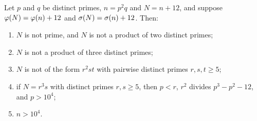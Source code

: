 \begin{theorem}
\label{thm:L}
Let \(p\) and \(q\) be distinct primes, \(n=p^2q\) and \(N=n+12\), and suppose \(\varphi(N)=\varphi(n)+12\) and \(\sigma(N)=\sigma(n)+12\). Then:
\begin{enumerate}
\item[\textup{(i)}] \(N\) is not prime, and \(N\) is not a product of two distinct primes;
\item[\textup{(ii)}] \(N\) is not a product of three distinct primes;
\item[\textup{(iii)}] \(N\) is not of the form \(r^2st\) with pairwise distinct primes \(r,s,t\ge 5\);
\item[\textup{(iv)}] if \(N=r^3s\) with distinct primes \(r,s\ge 5\), then \(p<r\), \(r^2\) divides \(p^3-p^2-12\), and \(p>10^4\);
\item[\textup{(v)}] \(n>10^4\).
\end{enumerate}
\end{theorem}
